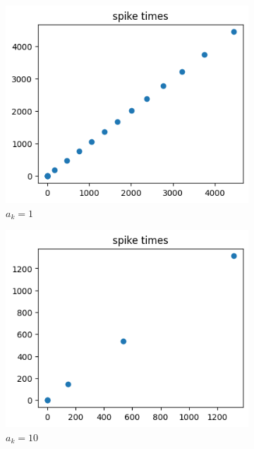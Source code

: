 \documentclass[12pt]{extreport}
\theoremstyle{definition}
\begin{document}
\begin{itemize}
\begin{figure}[H]
\centering
  \begin{subfigure}[b]{0.3\textwidth}
    \includegraphics[width=\textwidth]{Figs/aelif_a_k=1.png}
    \caption{$a_k=1$}
  \end{subfigure}
  \hfill
  \begin{subfigure}[b]{0.3\textwidth}
    \includegraphics[width=\textwidth]{Figs/aelif_a_k=10.png}
    \caption{$a_k=10$}
  \end{subfigure}
	\hfill
  \begin{subfigure}[b]{0.3\textwidth}

\end{subfigure}
\end{figure}
\end{itemize}
\end{document}
